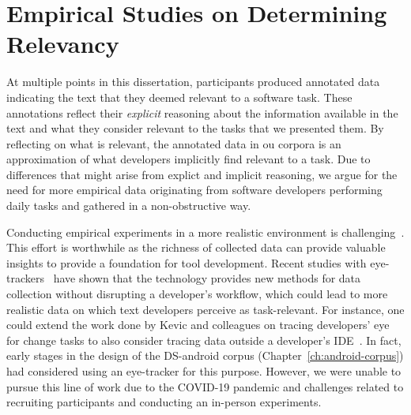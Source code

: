 






\section{Empirical Studies on Determining Relevancy}
\label{cp7:empirical-studies}



At multiple points in this dissertation, participants produced annotated data 
indicating the text that they deemed relevant to a software task. 
These annotations reflect their \textit{explicit} reasoning about the information 
available in the text and what they consider relevant to the tasks 
that we presented them. 
By reflecting 
on what is relevant, 
the annotated data in ou corpora is an approximation 
of what developers implicitly find relevant to a task. 
Due to differences that might arise from explict and implicit reasoning,
 we argue for the need for more empirical data 
originating from
software developers performing daily tasks
and gathered in a non-obstructive way.



Conducting empirical
 experiments in a more realistic environment is challenging~\cite{Kevic2015}.
This effort is worthwhile as
the richness of collected data can provide valuable insights
to provide a foundation for tool development.
Recent studies with eye-trackers~\cite{Cutrell2007, Petrusel2013, sharafi2020}
have shown that the technology provides new
methods for
data collection without disrupting a developer's workflow,
which could lead to more realistic data on which text developers perceive as task-relevant.
For instance, one could
extend the work done by Kevic and colleagues on
tracing developers' eye for change tasks to
also consider tracing data outside a developer's IDE~\cite{Kevic2015}.
In fact, early stages in the design of the 
\acs{DS-android} corpus (Chapter~\ref{ch:android-corpus}) had considered using 
an eye-tracker for this purpose.
However, we were unable to pursue this line of work 
due to the COVID-19 pandemic and challenges related to
recruiting participants and conducting an in-person experiments.




